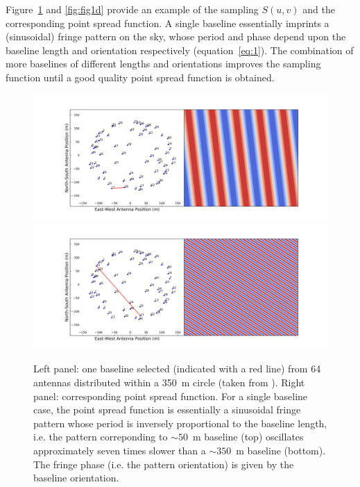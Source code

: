 Figure~\ref{fig:fig1c} and \ref{fig:fig1d} provide an example of the sampling $S(u,v)$ and the corresponding point spread function. A single baseline essentially imprints a (sinusoidal) fringe pattern on the sky, whose period and phase depend upon the baseline length and orientation respectively (equation~\ref{eq:1}). The combination of more baselines of different lengths and orientations improves the sampling function until a good quality point spread function is obtained.
%
\begin{figure}[]
\begin{center}
\includegraphics[width=1.\textwidth]{Bernardi/fringe_bl_11_18}
\includegraphics[width=1.\textwidth]{Bernardi/fringe_bl_17_15}
\end{center}
\caption{Left panel: one baseline selected (indicated with a red line) from 64 antennas distributed within a 350~m circle (taken from \cite{jacobs13}). Right panel: corresponding point spread function. For a single baseline case, the point spread function is essentially a sinusoidal fringe pattern whose period is inversely proportional to the baseline length, i.e. the pattern correponding to $\sim 50$~m baseline (top) oscillates approximately seven times slower than a $\sim 350$~m baseline (bottom). The fringe phase (i.e. the pattern orientation) is given by the baseline orientation.}
\label{fig:fig1c}
\end{figure}
